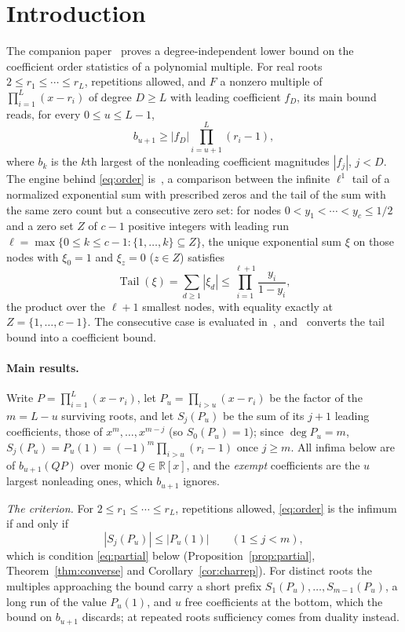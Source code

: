 \documentclass[11pt]{article}
\theoremstyle{definition}
\theoremstyle{plain}
\newcommand{\R}{\mathbb R}
\DeclareMathOperator{\Tail}{Tail}
\begin{document}
\section{Introduction}

The companion paper~\cite{coefficient-mass} proves a degree-independent
lower bound on the coefficient order statistics of a polynomial multiple.
For real roots $2\le r_1\le\cdots\le r_L$, repetitions allowed, and $F$ a
nonzero multiple of $\prod_{i=1}^L(x-r_i)$ of degree $D\ge L$ with leading
coefficient $f_D$, its main bound~\cite[Theorem~3.2]{coefficient-mass} reads,
for every $0\le u\le L-1$,
\begin{equation}\label{eq:order}
  b_{u+1}\ge|f_D|\prod_{i=u+1}^L(r_i-1),
\end{equation}
where $b_k$ is the $k$th largest of the nonleading coefficient magnitudes
$|f_j|$, $j<D$.  The engine behind \eqref{eq:order}
is~\cite[Theorem~2.2]{coefficient-mass}, a
comparison between the infinite $\ell^1$ tail of a normalized exponential
sum with prescribed zeros and the tail of the sum with the same zero count
but a consecutive zero set: for nodes $0<y_1<\cdots<y_c\le1/2$ and a zero
set $Z$ of $c-1$ positive integers with leading run
$\ell=\max\{0\le k\le c-1:\{1,\ldots,k\}\subseteq Z\}$, the unique exponential
sum $\xi$ on those nodes with $\xi_0=1$ and $\xi_z=0$ ($z\in Z$) satisfies
\[
  \Tail(\xi)=\sum_{d\ge1}|\xi_d|\le\prod_{i=1}^{\ell+1}\frac{y_i}{1-y_i},
\]
the product over the $\ell+1$ smallest nodes, with equality exactly at $Z=\{1,\ldots,c-1\}$.
The consecutive case is evaluated in~\cite[Lemma~2.1]{coefficient-mass},
and~\cite[Lemma~3.1]{coefficient-mass} converts the tail bound into a
coefficient bound.

\paragraph{Main results.}  Write $P=\prod_{i=1}^L(x-r_i)$, let
$P_u=\prod_{i>u}(x-r_i)$ be the factor of the $m=L-u$ surviving roots, and let
$S_j(P_u)$ be the sum of its $j+1$ leading coefficients, those of
$x^m,\ldots,x^{m-j}$ (so $S_0(P_u)=1$); since $\deg P_u=m$, $S_j(P_u)=P_u(1)=(-1)^m\prod_{i>u}(r_i-1)$ once $j\ge m$.  All
infima below are of $b_{u+1}(QP)$ over monic $Q\in\R[x]$, and the
\emph{exempt} coefficients are the $u$ largest nonleading ones, which
$b_{u+1}$ ignores.

\emph{The criterion.}  For $2\le r_1\le\cdots\le r_L$, repetitions allowed,
\eqref{eq:order} is the infimum if and only if
\[
  |S_j(P_u)|\le|P_u(1)|\qquad(1\le j<m),
\]
which is condition \eqref{eq:partial} below (Proposition~\ref{prop:partial},
Theorem~\ref{thm:converse} and Corollary~\ref{cor:charrep}).  For distinct roots the multiples
approaching the bound carry a short prefix $S_1(P_u),\ldots,S_{m-1}(P_u)$, a
long run of the value $P_u(1)$, and $u$ free coefficients at the bottom,
which the bound on $b_{u+1}$ discards; at repeated roots sufficiency comes from duality instead.
\end{document}
